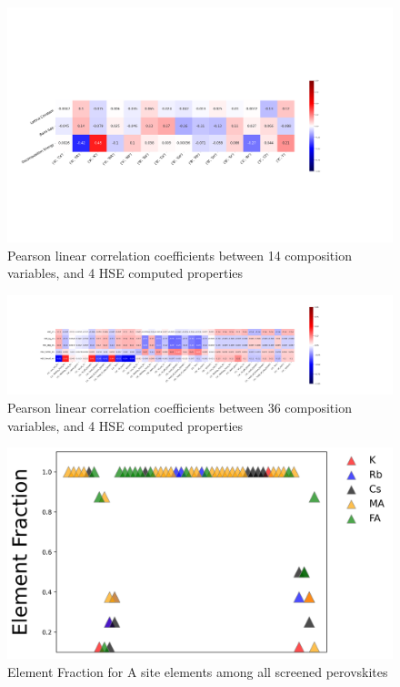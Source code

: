 \documentclass[twoside, twocolumn, 9pt, draft]{article}
\begin{document}
\begin{figure}
\centering
\includegraphics[width=.9\linewidth]{HSE_v_comp_pearson2.png}
\caption{\label{fig:pearson_hcomp} Pearson linear correlation coefficients between 14 composition variables, and 4 HSE computed properties}
\end{figure}

\begin{figure}
\centering
\includegraphics[width=.9\linewidth]{HSE_v_site_prop_pearson.png}
\caption{\label{fig:pearson_hsite} Pearson linear correlation coefficients between 36 composition variables, and 4 HSE computed properties}
\end{figure}

\begin{figure}
\centering
\includegraphics[width=.9\linewidth]{Element_AFrac.jpg}
\caption{\label{fig:sreened_frac_A} Element Fraction for A site elements among all screened perovskites}
\end{figure}
\end{document}
